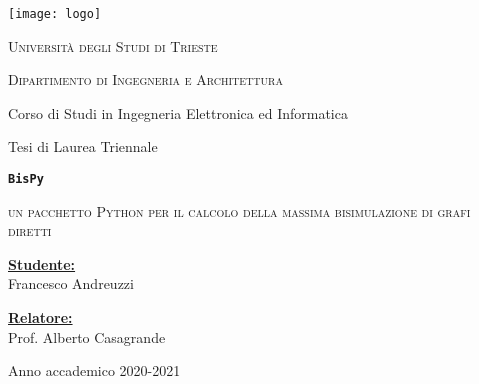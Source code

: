 \documentclass[11pt]{article}
\begin{document}
\begin{titlepage}
  \begin{center}
      \texttt{[image: logo]}

      \vspace{1cm}

      \Large
      \textsc{Università degli Studi di Trieste}
      \makebox[\textwidth][c]{\rule{\textwidth}{.4pt}}

      \textsc{Dipartimento di Ingegneria e Architettura}

      \vspace{0.5cm}
      Corso di Studi in Ingegneria Elettronica ed Informatica

      \vspace{1cm}

      Tesi di Laurea Triennale

      \vspace{1cm}

      \makebox[\textwidth][c]{\rule{\textwidth}{.4pt}}
      \Large
      \textbf{\texttt{BisPy}}

      \large
      \textsc{un pacchetto Python per il calcolo della massima bisimulazione di grafi diretti}
      \makebox[\textwidth][c]{\rule{\textwidth}{.4pt}}
      \vspace{1.5cm}

      \begin{minipage}{2in}
        \textbf{\underline{Studente:}} \\
        Francesco Andreuzzi
      \end{minipage}
      \hfill
      \begin{minipage}{2in}
        \textbf{\underline{Relatore:}} \\
        Prof. Alberto Casagrande
      \end{minipage}

      \vspace*{\fill}

      \makebox[\textwidth][c]{\rule{\textwidth}{.4pt}}

      Anno accademico 2020-2021
  \end{center}
\end{titlepage}

\blankpage

\renewcommand\contentsname{Indice}
\tableofcontents
{}


\blankpage

\clearpage

\clearpage

\clearpage
\blankpage

\clearpage

\renewcommand\refname{Bibliografia}


\end{document}
